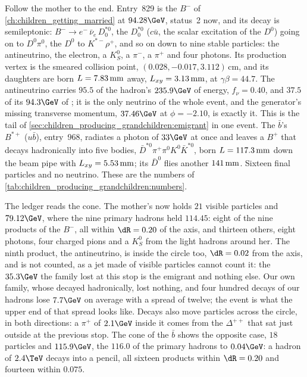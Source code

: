 Follow the mother to the end. Entry~829 is the $B^-$ of
\cref{ch:children_getting_married} at $94.28\GeV$, status~2 now, and its
decay is semileptonic: $B^-\to e^-\,\bar\nu_e\,D_0^{*0}$, the $D_0^{*0}$
($c\bar u$, the scalar excitation of the $D^0$) going on to
$D^0\pi^0$, the $D^0$ to $K^{*-}\rho^+$, and so on down to nine stable
particles: the antineutrino, the electron, a $K^0_S$, a $\pi^-$, a $\pi^+$
and four photons. Its production vertex is the smeared collision point,
$(0.028,-0.017,3.112)\,\mathrm{cm}$, and its daughters are born
$L=7.83\,\mathrm{mm}$ away, $L_{xy}=3.13\,\mathrm{mm}$, at $\gamma\beta=44.7$. The antineutrino carries $95.5$ of the hadron's
$235.9\GeV$ of energy, $f_\nu=0.40$, and $37.5$ of its $94.3\GeV$ of \pt;
it is the only neutrino of the whole event, and the generator's missing
transverse momentum, $37.46\GeV$ at $\phi=-2.10$, is exactly it. This is
the tail of \cref{sec:children_producing_grandchildren:emigrant} in one
event. The $\bar b$'s $B^{*+}$ ($u\bar b$), entry~968, radiates a photon
of $33\GeV$ at once and leaves a $B^+$ that decays hadronically into five
bodies, $\bar D^{*0}\pi^+\pi^0K^0\bar K^{*0}$, born $L=117.3\,\mathrm{mm}$ down the
beam pipe with $L_{xy}=5.53\,\mathrm{mm}$; its $\bar D^0$ flies another $141\,\mathrm{mm}$.
Sixteen final particles and no neutrino. These are the \CMSSW numbers of
\cref{tab:children_producing_grandchildren:numbers}.

The ledger reads the cone. The mother's now holds $21$ visible particles
and $79.12\GeV$, where the nine primary hadrons held $114.45$: eight of
the nine products of the $B^-$, all within $\dR=0.20$ of the axis, and
thirteen others, eight photons, four charged pions and a $K^0_S$ from the
light hadrons around her. The ninth product, the antineutrino, is inside
the circle too, $\dR=0.02$ from the axis, and is not counted, as a jet
made of visible particles cannot count it: the $35.3\GeV$ the family lost
at this stop is the emigrant and nothing else. Our own family, whose
\Bbar decayed hadronically, lost nothing, and four hundred decays of our
hadrons lose $7.7\GeV$ on average with a spread of twelve; the \CMSSW
event is what the upper end of that spread looks like. Decays also move
particles across the circle, in both directions: a $\pi^+$ of $2.1\GeV$
inside it comes from the $\Delta^{++}$ that sat just outside at the
previous stop. The cone of the $\bar b$ shows the opposite case, $18$
particles and $115.9\GeV$, the $116.0$ of the primary hadrons to
$0.04\GeV$: a hadron of $2.4\TeV$ decays into a pencil, all sixteen
products within $\dR=0.20$ and fourteen within $0.075$.

